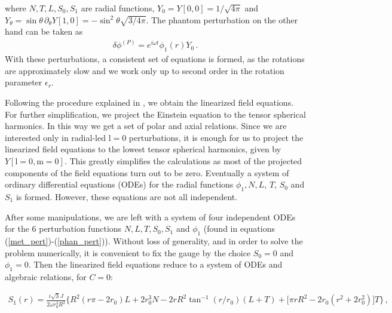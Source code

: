 \documentclass{article}
\begin{document}
%
%
%
%
where 
$N, T, L, {S}_0, {S}_1$ are radial functions, 
$Y_0=Y[0,0]
=1/\sqrt{4\pi}$ 
and 
$Y_\theta=\sin{\theta} \, \partial_\theta Y[1,0]
=-\sin^2{\theta}\sqrt{3/4\pi}$. 
The phantom perturbation on the other hand can be taken as
\begin{eqnarray}
\label{phan_pert}
 \delta{\phi}^{(P)} = 
 {e^{i\omega t}}
 {\phi_1(r)} Y_0 \, .
\end{eqnarray}
%
%
With these perturbations, a consistent set of equations is formed, as the rotations are approximately slow and we {work} only up to second order in the rotation parameter $\epsilon_r$.




Following the procedure explained in  \cite{Blazquez-Salcedo:2022eik}, we obtain the linearized field equations.
For further simplification, we project the Einstein equation to the tensor spherical harmonics. In this way we get a set of polar and axial relations. 
%
Since we are interested only in radial-led $\mathrm{l}=0$ perturbations, it is enough for us to project the linearized field equations to the lowest tensor spherical harmonics, given by $Y[\mathrm{l}=0,\mathrm{m}=0]$.  This greatly simplifies the calculations as
most of the projected components of the field equations turn out to be zero.
%
Eventually
a system of ordinary differential equations (ODEs) for the radial functions $\phi_1, N, L$, $T$, $S_0$ and $S_1$ is formed.
However, these equations are not all independent. 
%


{After some manipulations,}
we are left with a system of four independent ODEs 
%
for the 6 perturbation functions $N, L, T, {S}_0, {S}_1$ and ${\phi_1}$ (found in equations  (\ref{met_pert})-(\ref{phan_pert})). Without loss of generality, and in order to solve the problem numerically, it is convenient to fix the gauge
by the choice $S_0=0$ and $\phi_1=0$. Then the linearized field equations reduce to a system of ODEs and algebraic relations, {for $C=0$}:



\begin{eqnarray}
\label{eqS1}
S_1(r) =
\frac{i\sqrt{3} J}{2 \omega r_0^3  R^2} 
\Big\{
R^{2} (r \pi -2 {r_0} ) L
+ 2  r_0^{3} N
-2 r R^{2}  \tan^{-1} (r/r_0)
(L +T )
+
\Big[\pi rR^2 -2r_0(r^2+2r_0^2)\Big] T
\Big\}
\, ,
\end{eqnarray} 
\end{document}
